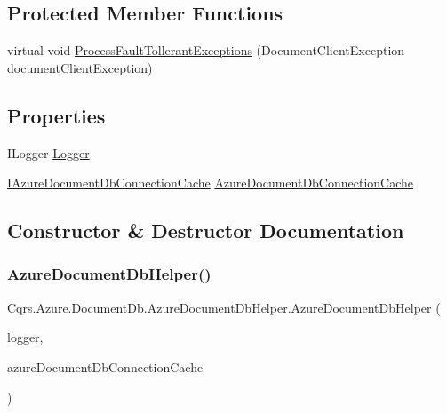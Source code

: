 \subsection*{Protected Member Functions}
\begin{DoxyCompactItemize}
\item 
virtual void \hyperlink{classCqrs_1_1Azure_1_1DocumentDb_1_1AzureDocumentDbHelper_a90b2dc3510f45a7cd5e6ed467a6f6d5e}{Process\+Fault\+Tollerant\+Exceptions} (Document\+Client\+Exception document\+Client\+Exception)
\end{DoxyCompactItemize}
\subsection*{Properties}
\begin{DoxyCompactItemize}
\item 
I\+Logger \hyperlink{classCqrs_1_1Azure_1_1DocumentDb_1_1AzureDocumentDbHelper_a2943b251ec8cb01b5900607e225de45e}{Logger}
\item 
\hyperlink{interfaceCqrs_1_1Azure_1_1DocumentDb_1_1IAzureDocumentDbConnectionCache}{I\+Azure\+Document\+Db\+Connection\+Cache} \hyperlink{classCqrs_1_1Azure_1_1DocumentDb_1_1AzureDocumentDbHelper_a1cda97d11a3b15128de55b31fe32b9d4}{Azure\+Document\+Db\+Connection\+Cache}
\end{DoxyCompactItemize}


\subsection{Constructor \& Destructor Documentation}
\mbox{\label{classCqrs_1_1Azure_1_1DocumentDb_1_1AzureDocumentDbHelper_af6557961f9bfc7685a1197d5fd40a35e}} 
\subsubsection{\texorpdfstring{Azure\+Document\+Db\+Helper()}{AzureDocumentDbHelper()}}
{\footnotesize\ttfamily Cqrs.\+Azure.\+Document\+Db.\+Azure\+Document\+Db\+Helper.\+Azure\+Document\+Db\+Helper (\begin{DoxyParamCaption}\item[{I\+Logger}]{logger,  }\item[{\hyperlink{interfaceCqrs_1_1Azure_1_1DocumentDb_1_1IAzureDocumentDbConnectionCache}{I\+Azure\+Document\+Db\+Connection\+Cache}}]{azure\+Document\+Db\+Connection\+Cache }\end{DoxyParamCaption})}



